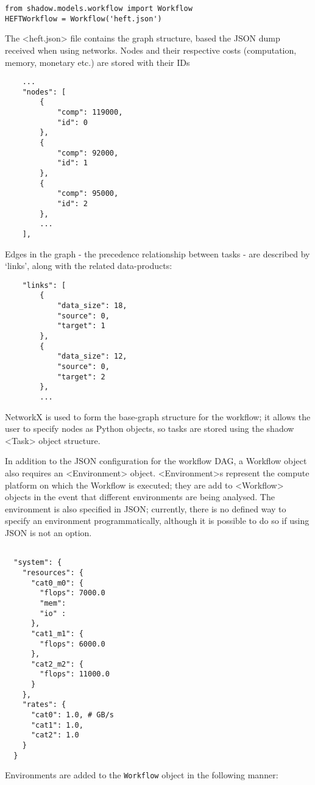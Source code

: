 \documentclass{article}
\begin{document}
\begin{multicols}{2}
\begin{verbatim}
from shadow.models.workflow import Workflow
HEFTWorkflow = Workflow('heft.json')
\end{verbatim}
The <heft.json> file contains the graph structure, based the JSON dump received when using networks. Nodes and their respective costs (computation, memory, monetary etc.) are stored with their IDs
\begin{verbatim}
    ...
    "nodes": [
        {
            "comp": 119000,
            "id": 0
        },
        {
            "comp": 92000,
            "id": 1
        },
        {
            "comp": 95000,
            "id": 2
        },
        ...
    ],
\end{verbatim}
Edges in the graph - the precedence relationship between tasks -  are described by ‘links’, along with the related data-products:
\begin{verbatim}
    "links": [
        {
            "data_size": 18,
            "source": 0,
            "target": 1
        },
        {
            "data_size": 12,
            "source": 0,
            "target": 2
        },
        ...
\end{verbatim}


NetworkX is used to form the base-graph structure for the workflow; it allows the user to specify nodes as Python objects, so tasks are stored using the shadow <Task> object structure. 

In addition to the JSON configuration for the workflow DAG, a Workflow object also requires an <Environment> object. <Environment>s represent the compute platform on which the Workflow is executed; they are add to <Workflow> objects in the event that different environments are being analysed. The environment is also specified in JSON; currently, there is no defined way to specify an environment programmatically, although it is possible to do so if using JSON is not an option. 

\begin{verbatim}

  "system": {
    "resources": {
      "cat0_m0": {
        "flops": 7000.0
        "mem":
        "io" : 
      },
      "cat1_m1": {
        "flops": 6000.0
      },
      "cat2_m2": {
        "flops": 11000.0
      }
    },
    "rates": {
      "cat0": 1.0, # GB/s
      "cat1": 1.0,
      "cat2": 1.0
    }
  }
\end{verbatim}

Environments are added to the \texttt{Workflow} object in the following manner: 


\end{multicols}
\end{document}
